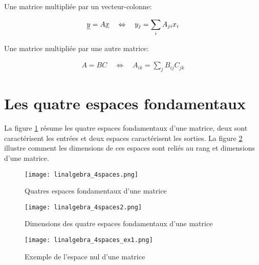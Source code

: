 Une matrice multipliée par un vecteur-colonne:

\begin{align}
\underline{y}  = A \underline{x} 
\quad \Leftrightarrow \quad
y_j = \sum_i{A_{ji} x_i }
\end{align}

Une matrice multipliée par une autre matrice:

\begin{align}
A  = B C
\quad \Leftrightarrow \quad
A_{ik} = \sum_j{B_{ij} C_{jk} }
\end{align}


\newpage
\section{Les quatre espaces fondamentaux}
\label{sec:4espfond}

La figure \ref{fig:4spaces} résume les quatre espaces fondamentaux d'une matrice, deux sont caractérisent les entrées et deux espaces caractérisent les sorties. La figure \ref{fig:4spaces2} illustre comment les dimensions de ces espaces sont reliés au rang et dimensions d'une matrice.

\begin{figure}[H]
	\centering
		\texttt{[image: linalgebra\_4spaces.png]}
	\caption{Quatres espaces fondamentaux d'une matrice}
	\label{fig:4spaces}
\end{figure}

\begin{figure}[H]
	\centering
		\texttt{[image: linalgebra\_4spaces2.png]}
	\caption{Dimensions des quatre espaces fondamentaux d'une matrice}
	\label{fig:4spaces2}
\end{figure}

\begin{example}
\begin{figure}[H]
	\centering
		\texttt{[image: linalgebra\_4spaces\_ex1.png]}
	\caption{Exemple de l'espace nul d'une matrice}
	\label{fig:4spaces_ex1}
\end{figure}
\end{example}

